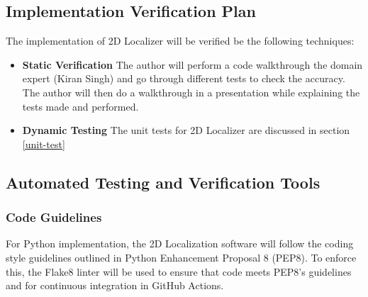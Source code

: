\documentclass[12pt, titlepage]{article}
\begin{document}


\subsection{Implementation Verification Plan}\label{plan_implement}

The implementation of 2D Localizer will be verified be the following techniques:
\begin{itemize}
  \item \textbf{Static Verification}
  \newline  
    The author will perform a code walkthrough the domain expert (Kiran Singh) and go through different tests to check the accuracy. The author will then do a walkthrough in a presentation while explaining the tests made and performed. 

  \item \textbf{Dynamic Testing}
  \newline
  The unit tests for 2D Localizer are discussed in section \ref{unit-test} 

\end{itemize}




\subsection{Automated Testing and Verification Tools}\label{plan_auto}

\subsubsection{Code Guidelines}
For Python implementation, the 2D Localization software will follow the coding style guidelines outlined in Python Enhancement Proposal 8 (PEP8). To enforce this, the Flake8 linter will be used to ensure that code meets PEP8's guidelines and for continuous integration in GitHub Actions.
\end{document}
